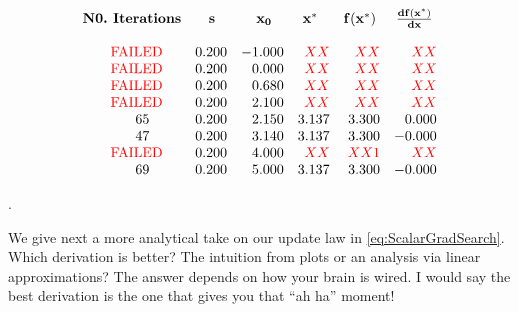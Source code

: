 \begin{equation}
\label{eq:resultsScalarGradSearch02}
\begin{array}{rrrrrr}
\text{\bf N0.~Iterations} & \mathbf{s} \hspace*{3mm} & \mathbf{x_0} \hspace*{3mm}& \mathbf{x^\ast} \hspace*{3mm} & \mathbf{f(x^\ast)} \hspace*{1mm} & \mathbf{\frac{d f(x^\ast)}{dx}} \hspace*{1mm}\\
\\
\color{red} \text{FAILED~~~~} &  0.200 & -1.000 & \color{red} XX & \color{red} XX  & \color{red} XX  \\
\color{red} \text{FAILED~~~~} & 0.200 & 0.000 & \color{red} XX  & \color{red} XX  & \color{red} XX  \\
\color{red} \text{FAILED~~~~} & 0.200 & 0.680 & \color{red} XX   & \color{red} XX  & \color{red} XX  \\
\color{red} \text{FAILED~~~~} & 0.200 & 2.100 & \color{red} XX  & \color{red} XX  & \color{red} XX  \\
65 \hspace*{8mm}&  0.200 & 2.150 & 3.137 & 3.300 & 0.000 \\
47  \hspace*{8mm}& 0.200 & 3.140 & 3.137 & 3.300 & -0.000 \\
\color{red} \text{FAILED~~~~} & 0.200 & 4.000 & \color{red} XX   & \color{red} XX 1 & \color{red} XX  \\
69 \hspace*{8mm} & 0.200 & 5.000 & 3.137 & 3.300 & -0.000 \\
\end{array}
\end{equation}

\Qed.

\vspace*{.5cm}
We give next a more analytical take on our update law in \eqref{eq:ScalarGradSearch}. Which derivation is better? The intuition from plots or an analysis via linear approximations? The answer depends on how your brain is wired. I would say the best derivation is the one that gives you that ``ah ha'' moment!
\vspace*{.5cm}

